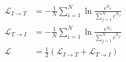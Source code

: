 \documentclass[border=6pt]{standalone}
\begin{document}
\color{ink}\begin{minipage}{165pt}\centering$\displaystyle \begin{aligned}\mathcal L_{I\to T}&=-\frac1N\sum_{i=1}^N\ln\frac{e^{S_{ii}}}{\sum_{j=1}^Ne^{S_{ij}}}\\[7pt]\mathcal L_{T\to I}&=-\frac1N\sum_{i=1}^N\ln\frac{e^{S_{ii}}}{\sum_{j=1}^Ne^{S_{ji}}}\\[7pt]\mathcal L&=\tfrac12(\mathcal L_{I\to T}+\mathcal L_{T\to I})\end{aligned}$\end{minipage}
\end{document}
